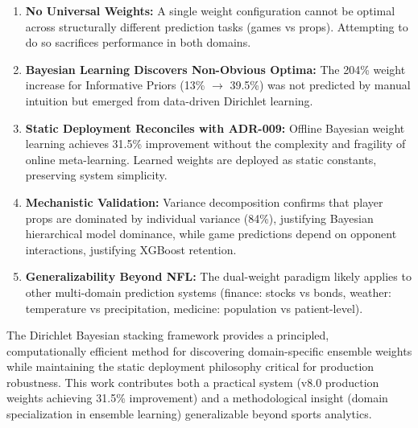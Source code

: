 \begin{enumerate}
\item \textbf{No Universal Weights:} A single weight configuration cannot be optimal across structurally different prediction tasks (games vs props). Attempting to do so sacrifices performance in both domains.

\item \textbf{Bayesian Learning Discovers Non-Obvious Optima:} The 204\% weight increase for Informative Priors (13\% $\to$ 39.5\%) was not predicted by manual intuition but emerged from data-driven Dirichlet learning.

\item \textbf{Static Deployment Reconciles with ADR-009:} Offline Bayesian weight learning achieves 31.5\% improvement without the complexity and fragility of online meta-learning. Learned weights are deployed as static constants, preserving system simplicity.

\item \textbf{Mechanistic Validation:} Variance decomposition confirms that player props are dominated by individual variance (84\%), justifying Bayesian hierarchical model dominance, while game predictions depend on opponent interactions, justifying XGBoost retention.

\item \textbf{Generalizability Beyond NFL:} The dual-weight paradigm likely applies to other multi-domain prediction systems (finance: stocks vs bonds, weather: temperature vs precipitation, medicine: population vs patient-level).
\end{enumerate}

The Dirichlet Bayesian stacking framework provides a principled, computationally efficient method for discovering domain-specific ensemble weights while maintaining the static deployment philosophy critical for production robustness. This work contributes both a practical system (v8.0 production weights achieving 31.5\% improvement) and a methodological insight (domain specialization in ensemble learning) generalizable beyond sports analytics.
